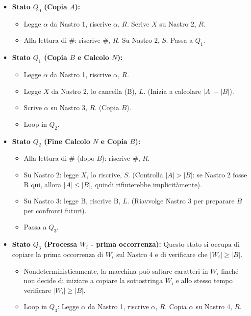 \documentclass[a4paper, 11pt]{book} %
\theoremstyle{definition}
\newcommand{\B}{\text{B}} %
\begin{document}
\begin{itemize}
    \item \textbf{Stato $Q_0$ (Copia $A$):}
        \begin{itemize}
            \item Legge $\alpha$ da Nastro 1, riscrive $\alpha$, $R$. Scrive $X$ su Nastro 2, $R$.
            \item Alla lettura di $\#$: riscrive $\#$, $R$. Su Nastro 2, $S$. Passa a $Q_1$.
        \end{itemize}
    \item \textbf{Stato $Q_1$ (Copia $B$ e Calcolo $N$):}
        \begin{itemize}
            \item Legge $\alpha$ da Nastro 1, riscrive $\alpha$, $R$.
            \item Legge $X$ da Nastro 2, lo cancella ($\B$), $L$. (Inizia a calcolare $|A|-|B|$).
            \item Scrive $\alpha$ su Nastro 3, $R$. (Copia $B$).
            \item Loop in $Q_2$.
        \end{itemize}
    \item \textbf{Stato $Q_2$ (Fine Calcolo $N$ e Copia $B$):}
        \begin{itemize}
            \item Alla lettura di $\#$ (dopo $B$): riscrive $\#$, $R$.
            \item Su Nastro 2: legge $X$, lo riscrive, $S$. (Controlla $|A|>|B|$: se Nastro 2 fosse $\B$ qui, allora $|A| \le |B|$, quindi rifiuterebbe implicitàmente).
            \item Su Nastro 3: legge $\B$, riscrive $\B$, $L$. (Riavvolge Nastro 3 per preparare $B$ per confronti futuri).
            \item Passa a $Q_3$.
        \end{itemize}
    \item \textbf{Stato $Q_3$ (Processa $W_i$ - prima occorrenza):}
        Questo stato si occupa di copiare la prima occorrenza di $W_i$ sul Nastro 4 e di verificare che $|W_i| \ge |B|$.
        \begin{itemize}
            \item Nondeterministicamente, la macchina può saltare caratteri in $W_i$ finché non decide di iniziare a copiare la sottostringa $W_i$ e allo stesso tempo verificare $|W_i| \ge |B|$.
            \item Loop in $Q_3$: Legge $\alpha$ da Nastro 1, riscrive $\alpha$, $R$. Copia $\alpha$ su Nastro 4, $R$.

\end{itemize}
\end{itemize}
\end{document}
